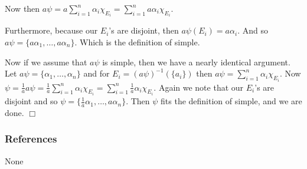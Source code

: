 \documentclass[letterpaper]{article}
\begin{document}
\begin{enumerate}
Now then $a\psi=a\sum\limits_{i=1}^n{\alpha_i\chi_{E_i}}=\sum\limits_{i=1}^n{a\alpha_i\chi_{E_i}}$.

Furthermore, because our $E_i$'s are disjoint, then $a\psi(E_i)=a\alpha_i$. And so $a\psi=\{a\alpha_1,\dots,a\alpha_n\}$. Which is the definition of simple.

Now if we assume that $a\psi$ is simple, then we have a nearly identical argument.
Let $a\psi=\{\alpha_1,\dots,\alpha_n\}$
and for $E_i=(a\psi)^{-1}(\{a_i\})$
then $a\psi=\sum\limits_{i=1}^n{\alpha_i\chi_{E_i}}$.
Now $\psi=\frac{1}{a}a\psi=\frac{1}{a}\sum\limits_{i=1}^n{\alpha_i\chi_{E_i}}=\sum\limits_{i=1}^n{\frac{1}{a}\alpha_i\chi_{E_i}}$.
Again we note that our $E_i$'s are disjoint and so $\psi=\{\frac{1}{a}\alpha_1,\dots,a\alpha_n\}$. Then $\psi$ fits the definition of simple, and we are done. $\Box$
\end{enumerate}
\subsubsection*{References}
None
\end{document}
